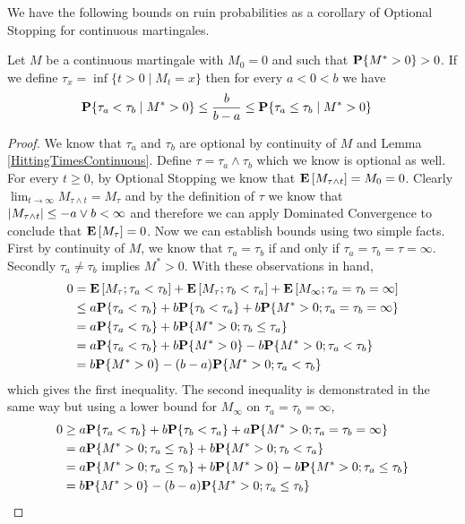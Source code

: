 We have the following bounds on ruin probabilities as a corollary of Optional Stopping for continuous martingales.
\begin{lem}\label{GamblersRuinContinuousMartingale}Let $M$ be a continuous martingale with $M_0 = 0$ and such that $\probability{M^* > 0} > 0$.  If we define $\tau_x = \inf \lbrace t>0 \mid M_t = x\rbrace$ then for every $a < 0 < b$ we have
\begin{align*}
\cprobability{M^* > 0}{\tau_a < \tau_b} &\leq \frac{b}{b-a} \leq \cprobability{M^* > 0}{\tau_a \leq \tau_b} 
\end{align*}
\end{lem}
\begin{proof}We know that $\tau_a$ and $\tau_b$ are optional by continuity of $M$ and Lemma \ref{HittingTimesContinuous}.  Define $\tau = \tau_a \wedge \tau_b$ which we know is optional as well.  For every $t \geq 0$, by Optional Stopping we know that $\expectation{M_{\tau \wedge t}} = M_0 = 0$.  Clearly $\lim_{t \to \infty} M_{\tau \wedge t} = M_\tau$ and by the definition of $\tau$ we know that $\abs{M_{\tau \wedge t}} \leq -a \vee b < \infty$ and therefore we can apply Dominated Convergence to conclude that $\expectation{M_\tau} = 0$.  Now we can establish bounds using two simple facts.   First by continuity of $M$, we know that $\tau_a = \tau_b$ if and only if $\tau_a = \tau_b = \tau = \infty$.   Secondly $\tau_a \neq \tau_b$ implies $M^* > 0$.  With these observations in hand,
\begin{align*}
0 &=\expectation{M_\tau; \tau_a < \tau_b} + \expectation{M_\tau; \tau_b < \tau_a} + \expectation{M_\infty; \tau_a = \tau_b =\infty} \\
&\leq a \probability{\tau_a < \tau_b} + b \probability{\tau_b < \tau_a} + b \probability{M^* > 0 ; \tau_a = \tau_b =\infty} \\
&= a \probability{\tau_a < \tau_b} + b \probability{M^* > 0 ; \tau_b \leq \tau_a} \\
&= a \probability{\tau_a < \tau_b} + b \probability{M^* > 0} - b \probability{M^* > 0 ; \tau_a < \tau_b} \\
&= b \probability{M^* > 0} - (b - a)\probability{M^* > 0 ; \tau_a < \tau_b} \\
\end{align*}
which gives the first inequality. The second inequality is demonstrated in the same way but using a lower bound for $M_\infty$ on $\tau_a = \tau_b = \infty$, 
\begin{align*}
0 &\geq a \probability{\tau_a < \tau_b} + b \probability{\tau_b < \tau_a} + a \probability{M^* > 0 ; \tau_a = \tau_b =\infty} \\
&= a \probability{M^* > 0; \tau_a \leq \tau_b} + b \probability{M^* > 0 ; \tau_b < \tau_a} \\
&= a \probability{M^* > 0; \tau_a \leq \tau_b} + b \probability{M^* > 0} - b \probability{M^* > 0 ; \tau_a \leq \tau_b} \\
&= b \probability{M^* > 0} - (b - a)\probability{M^* > 0; \tau_a \leq \tau_b} \\
\end{align*}
\end{proof}

